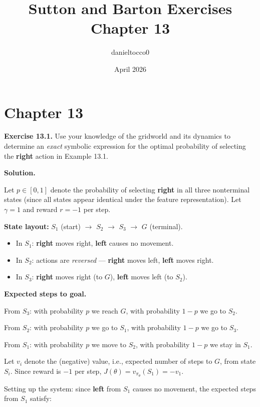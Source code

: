 \documentclass{article}
\title{Sutton and Barton Exercises Chapter 13}
\author{danieltocco0 }
\date{April 2026}
\begin{document}
\maketitle

\section{Chapter 13}

\textbf{Exercise 13.1.} Use your knowledge of the gridworld and its dynamics to determine an
\textit{exact} symbolic expression for the optimal probability of selecting the \textbf{right} action in
Example 13.1.

\bigskip

\textbf{Solution.}

Let $p \in [0,1]$ denote the probability of selecting \textbf{right} in all three nonterminal states
(since all states appear identical under the feature representation). Let $\gamma = 1$ and
reward $r = -1$ per step.

\bigskip

\textbf{State layout:} $S_1$ (start) $\to$ $S_2$ $\to$ $S_3$ $\to$ $G$ (terminal).

\begin{itemize}
  \item In $S_1$: \textbf{right} moves right, \textbf{left} causes no movement.
  \item In $S_2$: actions are \emph{reversed} — \textbf{right} moves left, \textbf{left} moves right.
  \item In $S_3$: \textbf{right} moves right (to $G$), \textbf{left} moves left (to $S_2$).
\end{itemize}

\bigskip

\textbf{Expected steps to goal.}

From $S_3$: with probability $p$ we reach $G$, with probability $1-p$ we go to $S_2$.

From $S_2$: with probability $p$ we go to $S_1$, with probability $1-p$ we go to $S_3$.

From $S_1$: with probability $p$ we move to $S_2$, with probability $1-p$ we stay in $S_1$.

\bigskip

Let $v_i$ denote the (negative) value, i.e., expected number of steps to $G$, from state $S_i$.
Since reward is $-1$ per step, $J(\theta) = v_{\pi_\theta}(S_1) = -v_1$.

\bigskip

Setting up the system: since \textbf{left} from $S_1$ causes no movement, the expected steps
from $S_1$ satisfy:
\end{document}
